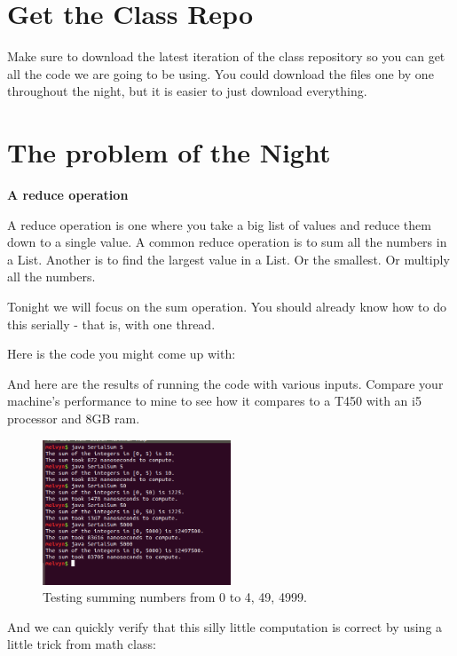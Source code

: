 \documentclass[12pt]{article}
\begin{document}
\section{Get the Class Repo}
Make sure to download the latest iteration of the class repository so you can
get all the code we are going to be using. You could download the files one by
one throughout the night, but it is easier to just download everything.

\section{The problem of the Night}
\label{problemStatement}

\begin{center}
\textbf{A reduce operation}
\end{center}

A reduce operation is one where you take a big list of values and reduce them
down to a single value. A common reduce operation is to sum all the numbers in a
List. Another is to find the largest value in a  List. Or the smallest. Or
multiply all the numbers.

Tonight we will focus on the sum operation. You should already know how to do
this serially - that is, with one thread.

Here is the code you might come up with:



And here are the results of running the code with various inputs. Compare your
machine's performance to mine to see how it compares to a T450 with an i5
processor and 8GB ram.

\begin{figure}[h]
  \label{serialresults}
  \centering
    \includegraphics[width=0.5\textwidth]{Images/SerialResults.png}
  \caption{Testing summing numbers from 0 to 4, 49, 4999.}
\end{figure}

And we can quickly verify that this silly little computation is correct by using
a little trick from math class:
\end{document}

